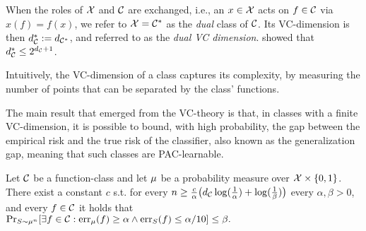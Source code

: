 \documentclass[12pt,a4paper,oneside,onecolumn]{book}
\begin{document}
When the roles of $\X$ and $\class$ are exchanged,
i.e., an $x\in\X$ acts on $f\in\class$
via
$x(f)=f(x)$, 
we refer to $\X=\class^*$ as the {\em dual} class of $\class$.
Its VC-dimension is then
$\dualvc{\class} := \vc{\class^*}$, 
and referred to as the \emph{dual VC dimension}.
\citet{MR723955} showed that 
$\dualvc{\class} \leq 2^{\vc{\class}+1}$.

Intuitively, the VC-dimension of a class captures its complexity,
by measuring the number of points that can be separated by the class' functions.

The main result that emerged from the VC-theory is that, in classes with a finite VC-dimension, it is possible to bound, with high probability,  the gap between the empirical risk and the true risk of the classifier, also known as the generalization gap, meaning that such classes are PAC-learnable.


\begin{theorem}
\label{thm:vc}
Let $\class$ be a function-class 
and let $\measure$ be a probability measure over  $\domain\times\{0,1\}$. 
There exist a constant $c$ s.t.
for every 
$n \geq
\frac{c}{\alpha}\big(\vc{\class} \log(\frac{1}{\alpha}) + \log(\frac{1}{\beta})\big)$
every $\alpha, \beta > 0$, 
and every $f \in \class$ it holds that
$
  \Pr_{S\sim \measure^n}[\exists f\in\class:
  \errD{f} \geq \alpha \wedge \errS{f}{S} \leq \alpha/10] \leq \beta.
$
\end{theorem}
\end{document}
